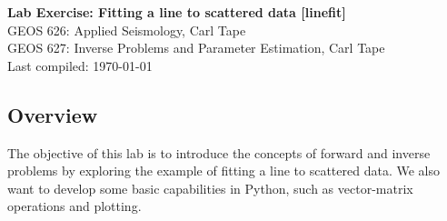 \documentclass[11pt,titlepage,fleqn]{article}
\begin{document}

\begin{spacing}{1.2}
\centering
{\large \bf Lab Exercise: Fitting a line to scattered data [linefit]} \\
GEOS 626: Applied Seismology, Carl Tape \\
GEOS 627: Inverse Problems and Parameter Estimation, Carl Tape \\
Last compiled: \today
\end{spacing}


\vspace{-0.5cm}
\subsection*{Overview}

The objective of this lab is to introduce the concepts of forward and inverse problems by exploring the example of fitting a line to scattered data. We also want to develop some basic capabilities in Python, such as vector-matrix operations and plotting.
\end{document}
